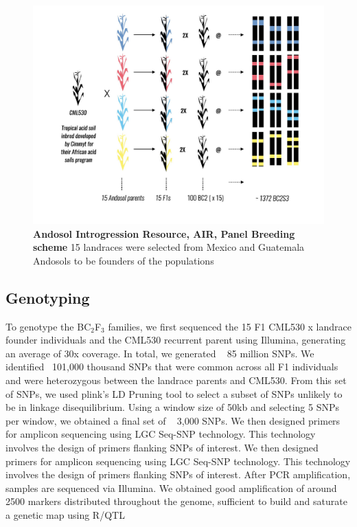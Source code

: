 \begin{figure}[!ht]
\includegraphics[width=0.8\paperwidth]{Chapter-3/figs/fig-27d.pdf}
\caption{\textbf{Andosol Introgression Resource, AIR, Panel Breeding scheme}
15 landraces were selected from Mexico and Guatemala Andosols to be founders of the populations}
\label{Fig3.0}
\end{figure}
\clearpage

\subsection{Genotyping}
 To genotype the BC$_2$F$_3$ families, we first sequenced the 15 F1 CML530 x landrace founder individuals and the CML530 recurrent parent using Illumina, generating an average of 30x coverage. In total, we generated ~ 85 million SNPs.
 We identified ~101,000 thousand SNPs that were common across all F1 individuals and were heterozygous between the landrace parents and CML530. From this set of SNPs, we used plink's LD Pruning tool to select a subset of SNPs unlikely to be in linkage disequilibrium. Using a window size of 50kb and selecting 5 SNPs per window,  we obtained a final set of ~ 3,000 SNPs.
 We then designed primers for amplicon sequencing using LGC Seq-SNP technology. This technology involves the design of primers flanking SNPs of interest.
 We then designed primers for amplicon sequencing using LGC Seq-SNP technology.
 This technology involves the design of primers flanking SNPs of interest.
 After PCR amplification, samples are sequenced via Illumina. We obtained good amplification of around 2500 markers distributed throughout the genome, sufficient to build and saturate a genetic map using R/QTL \citep{broman2012}

